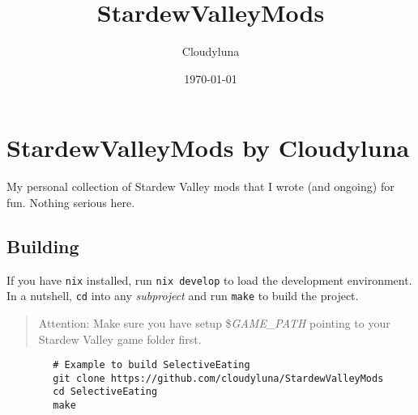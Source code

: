 \documentclass[a4paper,12pt]{article}
\title{StardewValleyMods}
\author{Cloudyluna}
\date{\today}
\begin{document}
\section{StardewValleyMods by Cloudyluna}

My personal collection of Stardew Valley mods that I wrote (and ongoing) for fun. Nothing serious here.


\subsection{Building}

If you have \texttt{nix} installed, run \texttt{nix develop} to load the development environment.
In a nutshell, \texttt{cd} into any \textit{subproject} and run \texttt{make} to build the project.

\begin{quote}
	Attention: Make sure you have setup \$\textit{GAME\_PATH} pointing to your Stardew Valley game folder first.
\end{quote}

\begin{verbatim}
		# Example to build SelectiveEating
		git clone https://github.com/cloudyluna/StardewValleyMods
		cd SelectiveEating
		make
\end{verbatim}

\thanksto

\licenseNotice
\end{document}
